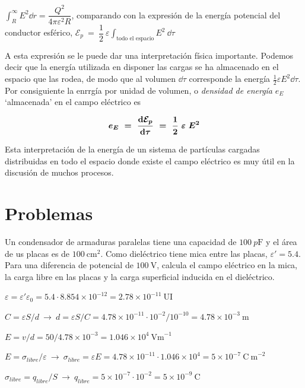 $\displaystyle \int_R^\infty E^2 \dd r=\dfrac {Q^2}{4\pi \varepsilon^2 R}$, comparando con la expresión de la energía potencial del conductor esférico,
$\displaystyle \mathcal E_p \ = \ \dfrac 1 2 \ \varepsilon \int_{\text{todo el espacio}} E^2 \ \dd \tau$

A esta expresión se le puede dar una interpretación física importante. Podemos decir que la energía utilizada en disponer las cargas se ha almacenado en el espacio que las rodea, de modo que al volumen $\dd \tau$ corresponde la energía $\frac 1 2 \varepsilon E^2 \dd \tau$. Por consiguiente la enrrgía por unidad de volumen, o \emph{densidad de energía} $e_E$ `almacenada' en el campo eléctrico es

\begin{equation}
\boldsymbol{ e_E\ = \ \displaystyle \dv{\mathcal E_p}{\tau}\ = \ \dfrac 1 2 \ \varepsilon \ E^2  } 	
\end{equation}

Esta interpretación de la energía de un sistema de partículas cargadas distribuidas en todo el espacio donde existe el campo eléctrico es muy útil en la discusión de muchos procesos.

\section{Problemas}

\begin{prob}
Un condensador de armaduras paralelas tiene una capacidad de $100\ p \mathrm{F}$	y el área de us placas es de $100\ \mathrm{cm}^2$. Como dieléctrico tiene mica entre las placas, $\varepsilon'=5.4$. Para una diferencia de potencial de $100\ \mathrm{V}$, calcula el campo eléctrico en la mica, la carga libre en las placas y la carga superficial inducida en el dieléctrico.
\end{prob}

$\varepsilon=\varepsilon' \varepsilon_0=5.4 \cdot 8.854 \times 10^{-12}=2.78\times 10^{-11}  \ \mathrm{UI}$

$C=\varepsilon S/d \ \to \ d=\varepsilon S/C= 4.78\times 10^{-11} \cdot 10^{-2} / 10^{-10} = 4.78\times 10^{-3} \ \mathrm{m}$

$E=v/d=50/4.78\times 10^{-3}=1.046\times 10^4\ \mathrm{V m}^{-1}$

$E=\sigma_{libre}/\varepsilon \ \to \ \sigma_{libre}=\varepsilon E= 4.78\times 10^{-11} \cdot 1.046\times 10^4=5\times 10^{-7} \ \mathrm{C\ m}^{-2}$

$\sigma_{libre}=q_{libre}/S \ \to \ q_{libre}=5\times 10^{-7} \cdot 10^{-2}=5\times 10^{-9}\ \mathrm{C}$

